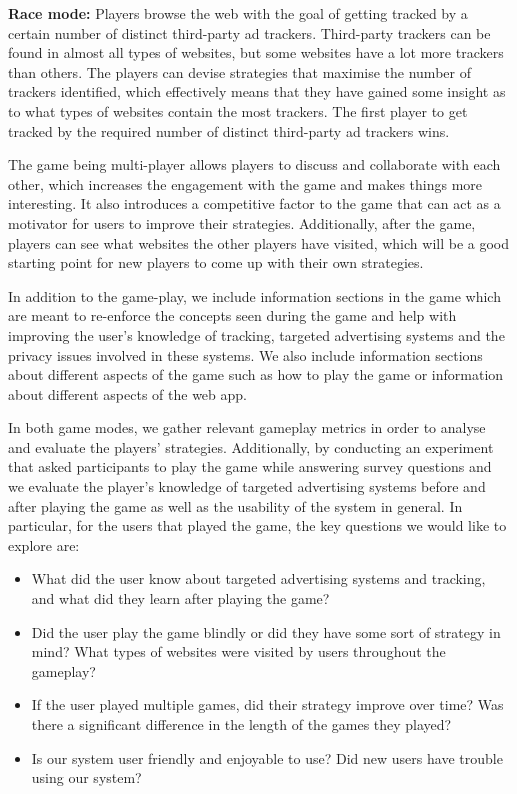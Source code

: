 \documentclass{l4proj}
\begin{document}
\textbf{Race mode:} Players browse the web with the goal of getting tracked by a certain number of distinct third-party ad trackers. Third-party trackers can be found in almost all types of websites, but some websites have a lot more trackers than others. The players can devise strategies that maximise the number of trackers identified, which effectively means that they have gained some insight as to what types of websites contain the most trackers. The first player to get tracked by the required number of distinct third-party ad trackers wins.

The game being multi-player allows players to discuss and collaborate with each other, which increases the engagement with the game and makes things more interesting. It also introduces a competitive factor to the game that can act as a motivator for users to improve their strategies.  Additionally, after the game, players can see what websites the other players have visited, which will be a good starting point for new players to come up with their own strategies.

In addition to the game-play, we include information sections in the game which are meant to re-enforce the concepts seen during the game and help with improving the user's knowledge of tracking, targeted advertising systems and the privacy issues involved in these systems. We also include information sections about different aspects of the game such as how to play the game or information about different aspects of the web app.     

In both game modes, we gather relevant gameplay metrics in order to analyse and evaluate the players' strategies. Additionally, by conducting an experiment that asked participants to play the game while answering survey questions and we evaluate the player's knowledge of targeted advertising systems before and after playing the game as well as the usability of the system in general. In particular, for the users that played the game, the key questions we would like to explore are:
\begin{itemize}
    \item
    What did the user know about targeted advertising systems and tracking, and what did they learn after playing the game?
    \item
    Did the user play the game blindly or did they have some sort of strategy in mind? What types of websites were visited by users throughout the gameplay?
    \item
    If the user played multiple games, did their strategy improve over time? Was there a significant difference in the length of the games they played? 
    \item
    Is our system user friendly and enjoyable to use? Did new users have trouble using our system?
\end{itemize}
\end{document}
